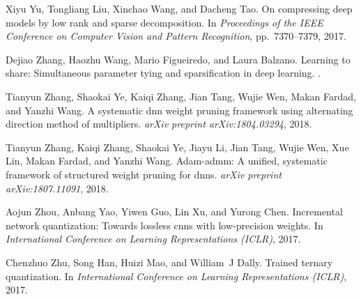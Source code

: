 \documentclass{article} %
\begin{document}
\begin{thebibliography}{36}
Xiyu Yu, Tongliang Liu, Xinchao Wang, and Dacheng Tao.
\newblock On compressing deep models by low rank and sparse decomposition.
\newblock In \emph{Proceedings of the IEEE Conference on Computer Vision and
  Pattern Recognition}, pp.\ 7370--7379, 2017.

Dejiao Zhang, Haozhu Wang, Mario Figueiredo, and Laura Balzano.
\newblock Learning to share: Simultaneous parameter tying and sparsification in
  deep learning.
.

Tianyun Zhang, Shaokai Ye, Kaiqi Zhang, Jian Tang, Wujie Wen, Makan Fardad, and
  Yanzhi Wang.
\newblock A systematic dnn weight pruning framework using alternating direction
  method of multipliers.
\newblock \emph{arXiv preprint arXiv:1804.03294}, 2018{}.

Tianyun Zhang, Kaiqi Zhang, Shaokai Ye, Jiayu Li, Jian Tang, Wujie Wen, Xue
  Lin, Makan Fardad, and Yanzhi Wang.
\newblock Adam-admm: A unified, systematic framework of structured weight
  pruning for dnns.
\newblock \emph{arXiv preprint arXiv:1807.11091}, 2018{}.

Aojun Zhou, Anbang Yao, Yiwen Guo, Lin Xu, and Yurong Chen.
\newblock Incremental network quantization: Towards lossless cnns with
  low-precision weights.
\newblock In \emph{International Conference on Learning Representations
  (ICLR)}, 2017.

Chenzhuo Zhu, Song Han, Huizi Mao, and William~J Dally.
\newblock Trained ternary quantization.
\newblock In \emph{International Conference on Learning Representations
  (ICLR)}, 2017.

\end{thebibliography}
\end{document}

